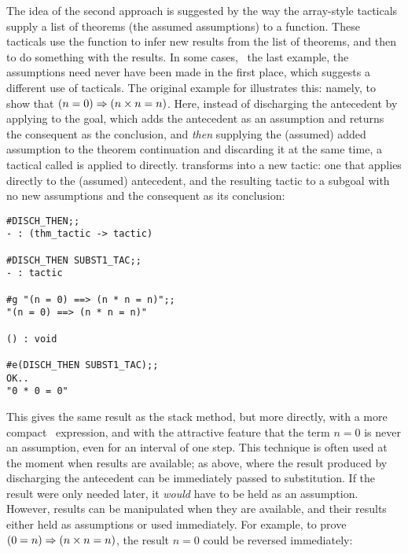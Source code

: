 The idea of the second approach is suggested by the way the array-style
tacticals supply a list of theorems (the assumed assumptions)
to a function.  These tacticals use the function to
infer new
results from the list of theorems, and then to do something with the
results. In some cases,
\eg\ the last example, the assumptions need never have been made in the
first place, which suggests a different use of tacticals.
The original example for 
illustrates this: namely, to show that $(n = 0) \Rightarrow (n\times n = n)$.  Here,
instead of discharging the antecedent by applying
 to the goal, which adds the antecedent as an assumption
and returns the consequent as the conclusion,
and {\it then\/} supplying the (assumed) added assumption to the
theorem continuation  and
discarding it at the same time,
a tactical called  is applied to  directly.
 transforms  into
a new tactic: one that applies  directly to the (assumed)
antecedent, and the resulting tactic to a subgoal with no new
assumptions and the consequent as its conclusion:
\vfill
\newpage

\setcounter{sessioncount}{1}
\begin{session}\begin{verbatim}
#DISCH_THEN;;
- : (thm_tactic -> tactic)

#DISCH_THEN SUBST1_TAC;;
- : tactic

#g "(n = 0) ==> (n * n = n)";;
"(n = 0) ==> (n * n = n)"

() : void

#e(DISCH_THEN SUBST1_TAC);;
OK..
"0 * 0 = 0"
\end{verbatim}\end{session}

\noindent This gives the same result as the stack method, but more
directly, with a more compact \ML\ expression,
and with the attractive feature that the term
$n=0$ is never an assumption, even for an interval of one step.
This technique is often used at the moment when results are available;
as above, where the result produced by discharging the antecedent can be
immediately passed to substitution. If the result were only needed
later, it {\it would\/} have to be held as an assumption. However, results
can be manipulated when they are available, and their results
either held as assumptions or used immediately.
For example, to prove $(0=n) \Rightarrow (n \times n = n)$,
the result $n=0$ could be reversed
immediately:


